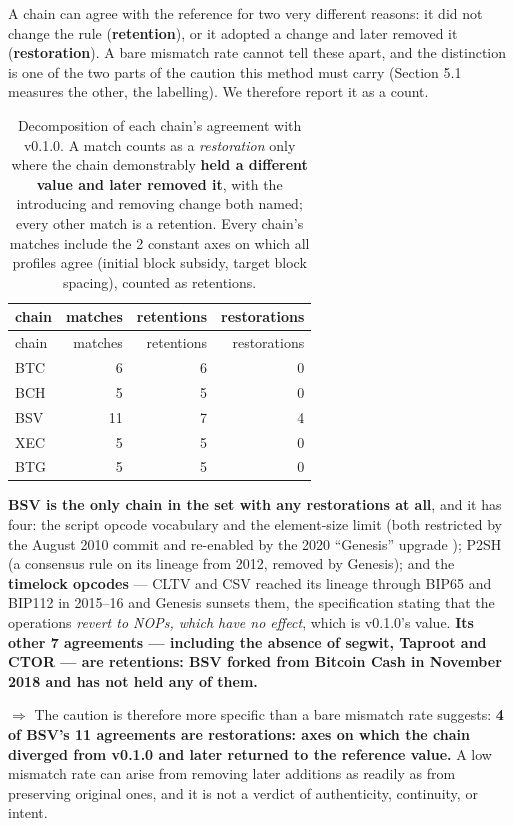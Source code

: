 \documentclass[
]{article}
\begin{document}
A chain can agree with the reference for two very different reasons: it
did not change the rule (\textbf{retention}), or it adopted a change and
later removed it (\textbf{restoration}). A bare mismatch rate cannot
tell these apart, and the distinction is one of the two parts of the
caution this method must carry (Section 5.1 measures the other, the
labelling). We therefore report it as a count.

\begin{longtable}[]{@{}lrrr@{}}
\caption{Decomposition of each chain's agreement with v0.1.0. A match
counts as a \emph{restoration} only where the chain demonstrably
\textbf{held a different value and later removed it}, with the
introducing and removing change both named; every other match is a
retention. Every chain's matches include the 2 constant axes on which
all profiles agree (initial block subsidy, target block spacing),
counted as retentions.}\tabularnewline
\toprule\noalign{}
chain & matches & retentions & restorations \\
\midrule\noalign{}
\endfirsthead
\toprule\noalign{}
chain & matches & retentions & restorations \\
\midrule\noalign{}
\endhead
\bottomrule\noalign{}
\endlastfoot
BTC & 6 & 6 & 0 \\
BCH & 5 & 5 & 0 \\
BSV & 11 & 7 & 4 \\
XEC & 5 & 5 & 0 \\
BTG & 5 & 5 & 0 \\
\end{longtable}

\textbf{BSV is the only chain in the set with any restorations at all},
and it has four: the script opcode vocabulary and the element-size limit
(both restricted by the August 2010 commit and re-enabled by the 2020
``Genesis'' upgrade \citep{bsv_genesis}); P2SH (a consensus rule on its
lineage from 2012, removed by Genesis); and the \textbf{timelock
opcodes} --- CLTV and CSV reached its lineage through BIP65 and BIP112
in 2015--16 and Genesis sunsets them, the specification stating that the
operations \emph{revert to NOPs, which have no effect}, which is
v0.1.0's value. \textbf{Its other 7 agreements --- including the absence
of segwit, Taproot and CTOR --- are retentions: BSV forked from Bitcoin
Cash in November 2018 and has not held any of them.}

\(\Rightarrow\) The caution is therefore more specific than a bare
mismatch rate suggests: \textbf{4 of BSV's 11 agreements are
restorations: axes on which the chain diverged from v0.1.0 and later
returned to the reference value.} A low mismatch rate can arise from
removing later additions as readily as from preserving original ones,
and it is not a verdict of authenticity, continuity, or intent.
\end{document}
